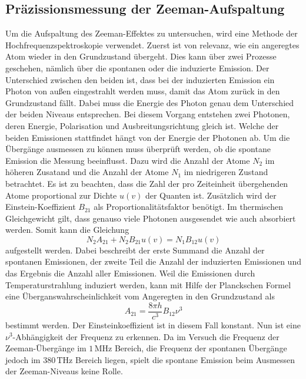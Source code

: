 \subsection{Präzissionsmessung der Zeeman-Aufspaltung}

Um die Aufspaltung des Zeeman-Effektes zu untersuchen, wird eine Methode der Hochfrequenzspektroskopie verwendet. Zuerst ist von relevanz, wie ein angeregtes Atom wieder in den Grundzustand übergeht. Dies
kann über zwei Prozesse geschehen, nämlich über die spontanen oder die induzierte Emission. Der Unterschied zwischen den beiden ist, dass bei der induzierten Emission ein Photon von außen
eingestrahlt werden muss, damit das Atom zurück in den Grundzustand fällt. Dabei muss die Energie des Photon genau dem Unterschied der beiden Niveaus entsprechen. Bei diesem Vorgang entstehen zwei Photonen,
deren Energie, Polarisation und Ausbreitungsrichtung gleich ist.
Welche der beiden Emissionen stattfindet hängt von der Energie der Photonen ab. Um die Übergänge ausmessen zu können muss überprüft werden, ob die spontane Emission die Messung beeinflusst.
Dazu wird die Anzahl der Atome $N_2$ im höheren Zusatand und die Anzahl der Atome $N_1$ im niedrigeren Zustand betrachtet.
Es ist zu beachten, dass die Zahl der pro Zeiteinheit übergehenden Atome proportional zur Dichte $u(v)$ der Quanten ist. Zusätzlich wird der Einstein-Koeffizient $B_{21}$ als Proportionalitätsfaktor benötigt.
Im thermischen Gleichgewicht gilt, dass genauso viele Photonen ausgesendet wie auch absorbiert werden. Somit kann die Gleichung
\begin{equation}
  N_2A_{21}+N_2B_{21}u(v)=N_1B_{12}u(v)
\end{equation}
aufgestellt werden. Dabei beschreibt der erste Summand die Anzahl der spontanen Emissionen, der zweite Teil die Anzahl der induzierten Emissionen und das Ergebnis die Anzahl aller Emissionen.
Weil die Emissionen durch Temperaturstrahlung induziert werden, kann mit Hilfe der Planckschen Formel eine Überganswahrscheinlichkeit vom Angeregten in den Grundzustand als
\begin{equation}
  A_{21}=\frac{8\pi h}{c^3}B_{12}\nu^3
\end{equation}
bestimmt werden. Der Einsteinkoeffizient ist in diesem Fall konstant. Nun ist eine $\nu^3$-Abhängigkeit der Frequenz zu erkennen. Da im Versuch die Frequenz der Zeeman-Übergänge im $1\,\text{MHz}$ Bereich,
die Frequenz der spontanen Übergänge jedoch im $380\,\text{THz}$ Bereich liegen, spielt die spontane Emission beim Ausmessen der Zeeman-Niveaus keine Rolle.


